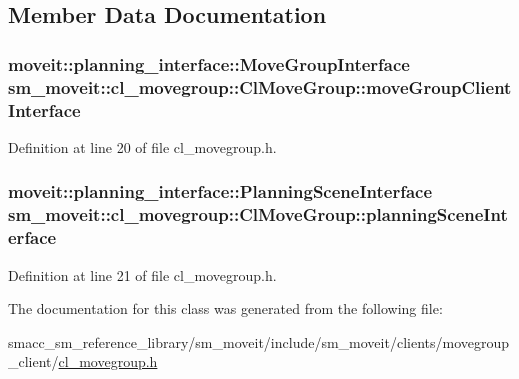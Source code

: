 \subsection{Member Data Documentation}
\subsubsection[{\texorpdfstring{move\+Group\+Client\+Interface}{moveGroupClientInterface}}]{\setlength{\rightskip}{0pt plus 5cm}moveit\+::planning\+\_\+interface\+::\+Move\+Group\+Interface sm\+\_\+moveit\+::cl\+\_\+movegroup\+::\+Cl\+Move\+Group\+::move\+Group\+Client\+Interface}\hypertarget{classsm__moveit_1_1cl__movegroup_1_1ClMoveGroup_a23acf6883455566dbab30e4367c2144d}{}\label{classsm__moveit_1_1cl__movegroup_1_1ClMoveGroup_a23acf6883455566dbab30e4367c2144d}


Definition at line 20 of file cl\+\_\+movegroup.\+h.

\subsubsection[{\texorpdfstring{planning\+Scene\+Interface}{planningSceneInterface}}]{\setlength{\rightskip}{0pt plus 5cm}moveit\+::planning\+\_\+interface\+::\+Planning\+Scene\+Interface sm\+\_\+moveit\+::cl\+\_\+movegroup\+::\+Cl\+Move\+Group\+::planning\+Scene\+Interface}\hypertarget{classsm__moveit_1_1cl__movegroup_1_1ClMoveGroup_a26b5c9e0aef1cd67ee977a756b69cf76}{}\label{classsm__moveit_1_1cl__movegroup_1_1ClMoveGroup_a26b5c9e0aef1cd67ee977a756b69cf76}


Definition at line 21 of file cl\+\_\+movegroup.\+h.



The documentation for this class was generated from the following file\+:\begin{DoxyCompactItemize}
\item 
smacc\+\_\+sm\+\_\+reference\+\_\+library/sm\+\_\+moveit/include/sm\+\_\+moveit/clients/movegroup\+\_\+client/\hyperlink{cl__movegroup_8h}{cl\+\_\+movegroup.\+h}\end{DoxyCompactItemize}
